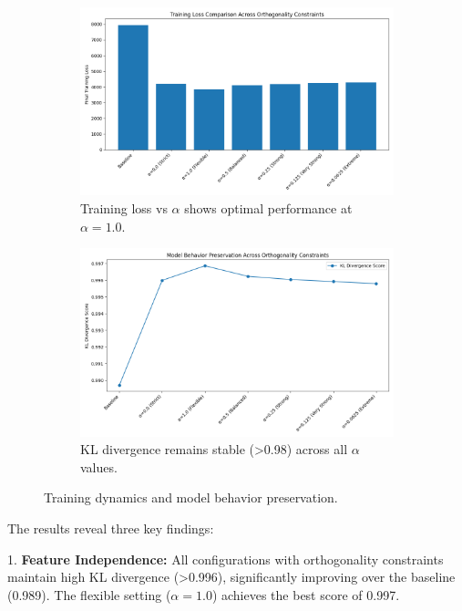 \documentclass{article} %
\begin{document}
\begin{figure}[h]
\centering
\begin{subfigure}{0.48\textwidth}
\includegraphics[width=\textwidth]{training_loss_comparison.png}
\caption{Training loss vs $\alpha$ shows optimal performance at $\alpha=1.0$.}
\label{fig:loss}
\end{subfigure}
\hfill
\begin{subfigure}{0.48\textwidth}
\includegraphics[width=\textwidth]{kl_divergence_comparison.png}
\caption{KL divergence remains stable (>0.98) across all $\alpha$ values.}
\label{fig:kl}
\end{subfigure}
\caption{Training dynamics and model behavior preservation.}
\label{fig:training}
\end{figure}

The results reveal three key findings:

1. \textbf{Feature Independence:} All configurations with orthogonality constraints maintain high KL divergence (>0.996), significantly improving over the baseline (0.989). The flexible setting ($\alpha=1.0$) achieves the best score of 0.997.
\end{document}
